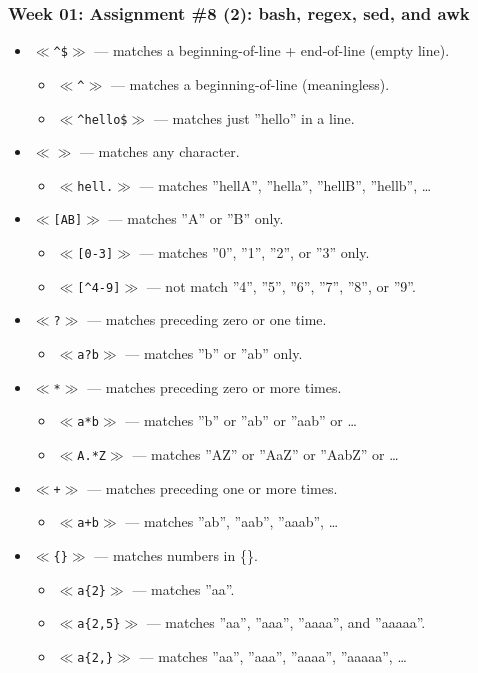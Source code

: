 \documentclass[xcolor=table, notheorems, hyperref={pdfpagelabels=false}]{beamer}
\begin{document}
\begin{frame}[fragile]
\frametitle{Week 01: Assignment \#8 (2): bash, regex, sed, and awk}
\begin{itemize}
\item $\ll$\texttt{\^{}\${}}$\gg$ --- matches a beginning-of-line + end-of-line (empty line).
\begin{itemize}
\item $\ll$\texttt{\^{}}$\gg$ --- matches a beginning-of-line (meaningless).
\item $\ll$\texttt{\^{}hello\${}}$\gg$ --- matches just ''hello'' in a line.
\end{itemize}
\item $\ll${\tiny{}\textbullet}$\gg$ --- matches any character.
\begin{itemize}
\item $\ll$\texttt{hell.}$\gg$ --- matches ''hellA'', ''hella'', ''hellB'', ''hellb'', \ldots
\end{itemize}
\item $\ll$\texttt{[AB]}$\gg$ --- matches ''A'' or ''B'' only.
\begin{itemize}
\item $\ll$\texttt{[0-3]}$\gg$ --- matches ''0'', ''1'', ''2'', or ''3'' only.
\item $\ll$\texttt{[\^{}4-9]}$\gg$ --- not match ''4'', ''5'', ''6'', ''7'', ''8'', or ''9''.
\end{itemize}
\item $\ll$\texttt{?}$\gg$ --- matches preceding zero or one time.
\begin{itemize}
\item $\ll$\texttt{a?b}$\gg$ --- matches ''b'' or ''ab'' only.
\end{itemize}
\item $\ll$\texttt{*}$\gg$ --- matches preceding zero or more times.
\begin{itemize}
\item $\ll$\texttt{a*b}$\gg$ --- matches ''b'' or ''ab'' or ''aab'' or \ldots
\item $\ll$\texttt{A.*Z}$\gg$ --- matches ''AZ'' or ''AaZ'' or ''AabZ'' or \ldots
\end{itemize}
\item $\ll$\texttt{+}$\gg$ --- matches preceding one or more times.
\begin{itemize}
\item $\ll$\texttt{a+b}$\gg$ --- matches ''ab'', ''aab'', ''aaab'', \ldots
\end{itemize}
\item $\ll$\texttt{\{\}}$\gg$ --- matches numbers in \{\}.
\begin{itemize}
\item $\ll$\texttt{a\{2\}}$\gg$ --- matches ''aa''.
\item $\ll$\texttt{a\{2,5\}}$\gg$ --- matches ''aa'', ''aaa'', ''aaaa'', and ''aaaaa''.
\item $\ll$\texttt{a\{2,\}}$\gg$ --- matches ''aa'', ''aaa'', ''aaaa'', ''aaaaa'', \ldots
\end{itemize}
\end{itemize}
\end{frame}
\end{document}
